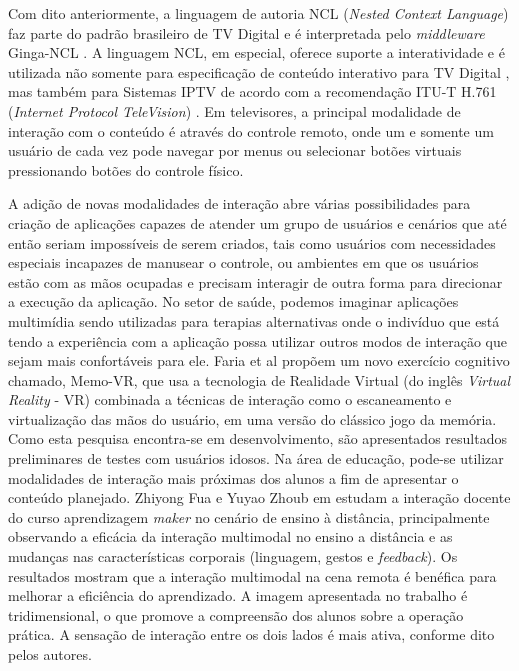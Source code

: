 Com dito anteriormente, a linguagem de autoria NCL (\textit{Nested Context Language}) \cite{soares:2011-prog-NCL} faz parte do padrão brasileiro de TV Digital e é interpretada pelo \textit{middleware} Ginga-NCL \cite{ABNT:2011aa}. A linguagem NCL, em especial, oferece suporte a interatividade e é utilizada não somente para especificação de conteúdo interativo para TV Digital \cite{Soares:2007aa}, mas também para Sistemas IPTV de acordo com a recomendação ITU-T H.761 (\textit{Internet Protocol TeleVision}) \cite{ITU:2009ma}. Em televisores, a principal modalidade de interação com o conteúdo é através do controle remoto, onde um e somente um usuário de cada vez pode navegar por menus ou selecionar botões virtuais pressionando botões do controle físico.  

A adição de novas modalidades de interação abre várias possibilidades para criação de aplicações capazes de atender um grupo de usuários e cenários que até então seriam impossíveis de serem criados, tais como usuários com necessidades especiais incapazes de manusear o controle, ou ambientes em que os usuários estão com as mãos ocupadas e precisam interagir de outra forma para direcionar a execução da aplicação. No setor de saúde, podemos imaginar aplicações multimídia sendo utilizadas para terapias alternativas onde o indivíduo que está tendo a experiência com a aplicação possa utilizar outros modos de interação que sejam mais confortáveis para ele. Faria et al \cite{farias2020memo} propõem um novo exercício cognitivo chamado, Memo-VR, que usa a tecnologia de Realidade Virtual (do inglês \textit{Virtual Reality} - VR) combinada a técnicas de interação como o escaneamento e virtualização das mãos do usuário, em uma versão do clássico jogo da memória. Como esta pesquisa encontra-se em desenvolvimento, são apresentados resultados preliminares de testes com usuários idosos. Na área de educação, pode-se utilizar modalidades de interação mais próximas dos alunos a fim de apresentar o conteúdo planejado. Zhiyong Fua e Yuyao Zhoub em \cite{fu2019research} estudam a interação docente do curso aprendizagem \textit{maker} no cenário de ensino à distância, principalmente observando a eficácia da interação multimodal no ensino a distância e as mudanças nas características corporais (linguagem, gestos e \textit{feedback}). Os resultados mostram que a interação multimodal na cena remota é benéfica para melhorar a eficiência do aprendizado. A imagem apresentada no trabalho é tridimensional, o que promove a compreensão dos alunos sobre a operação prática. A sensação de interação entre os dois lados é mais ativa, conforme dito pelos autores.


